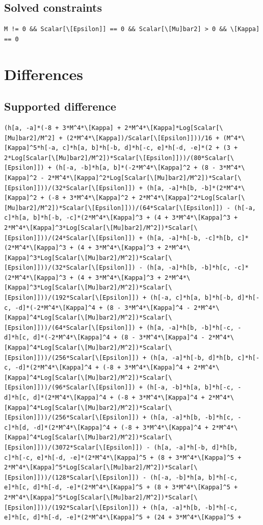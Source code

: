 \documentclass[11pt]{article}
\begin{document}
\subsection{Solved constraints}
\begin{verbatim}
M != 0 && Scalar[\[Epsilon]] == 0 && Scalar[\[Mu]bar2] > 0 && \[Kappa] == 0
\end{verbatim}
\section{Differences}
\subsection{Supported difference}
\begin{verbatim}
(h[a, -a]*(-8 + 3*M^4*\[Kappa] + 2*M^4*\[Kappa]*Log[Scalar[\[Mu]bar2]/M^2] + (2*M^4*\[Kappa])/Scalar[\[Epsilon]]))/16 + (M^4*\[Kappa]^5*h[-a, c]*h[a, b]*h[-b, d]*h[-c, e]*h[-d, -e]*(2 + (3 + 2*Log[Scalar[\[Mu]bar2]/M^2])*Scalar[\[Epsilon]]))/(80*Scalar[\[Epsilon]]) + (h[-a, -b]*h[a, b]*(-2*M^4*\[Kappa]^2 + (8 - 3*M^4*\[Kappa]^2 - 2*M^4*\[Kappa]^2*Log[Scalar[\[Mu]bar2]/M^2])*Scalar[\[Epsilon]]))/(32*Scalar[\[Epsilon]]) + (h[a, -a]*h[b, -b]*(2*M^4*\[Kappa]^2 + (-8 + 3*M^4*\[Kappa]^2 + 2*M^4*\[Kappa]^2*Log[Scalar[\[Mu]bar2]/M^2])*Scalar[\[Epsilon]]))/(64*Scalar[\[Epsilon]]) - (h[-a, c]*h[a, b]*h[-b, -c]*(2*M^4*\[Kappa]^3 + (4 + 3*M^4*\[Kappa]^3 + 2*M^4*\[Kappa]^3*Log[Scalar[\[Mu]bar2]/M^2])*Scalar[\[Epsilon]]))/(24*Scalar[\[Epsilon]]) + (h[a, -a]*h[-b, -c]*h[b, c]*(2*M^4*\[Kappa]^3 + (4 + 3*M^4*\[Kappa]^3 + 2*M^4*\[Kappa]^3*Log[Scalar[\[Mu]bar2]/M^2])*Scalar[\[Epsilon]]))/(32*Scalar[\[Epsilon]]) - (h[a, -a]*h[b, -b]*h[c, -c]*(2*M^4*\[Kappa]^3 + (4 + 3*M^4*\[Kappa]^3 + 2*M^4*\[Kappa]^3*Log[Scalar[\[Mu]bar2]/M^2])*Scalar[\[Epsilon]]))/(192*Scalar[\[Epsilon]]) + (h[-a, c]*h[a, b]*h[-b, d]*h[-c, -d]*(-2*M^4*\[Kappa]^4 + (8 - 3*M^4*\[Kappa]^4 - 2*M^4*\[Kappa]^4*Log[Scalar[\[Mu]bar2]/M^2])*Scalar[\[Epsilon]]))/(64*Scalar[\[Epsilon]]) + (h[a, -a]*h[b, -b]*h[-c, -d]*h[c, d]*(-2*M^4*\[Kappa]^4 + (8 - 3*M^4*\[Kappa]^4 - 2*M^4*\[Kappa]^4*Log[Scalar[\[Mu]bar2]/M^2])*Scalar[\[Epsilon]]))/(256*Scalar[\[Epsilon]]) + (h[a, -a]*h[-b, d]*h[b, c]*h[-c, -d]*(2*M^4*\[Kappa]^4 + (-8 + 3*M^4*\[Kappa]^4 + 2*M^4*\[Kappa]^4*Log[Scalar[\[Mu]bar2]/M^2])*Scalar[\[Epsilon]]))/(96*Scalar[\[Epsilon]]) + (h[-a, -b]*h[a, b]*h[-c, -d]*h[c, d]*(2*M^4*\[Kappa]^4 + (-8 + 3*M^4*\[Kappa]^4 + 2*M^4*\[Kappa]^4*Log[Scalar[\[Mu]bar2]/M^2])*Scalar[\[Epsilon]]))/(256*Scalar[\[Epsilon]]) + (h[a, -a]*h[b, -b]*h[c, -c]*h[d, -d]*(2*M^4*\[Kappa]^4 + (-8 + 3*M^4*\[Kappa]^4 + 2*M^4*\[Kappa]^4*Log[Scalar[\[Mu]bar2]/M^2])*Scalar[\[Epsilon]]))/(3072*Scalar[\[Epsilon]]) - (h[a, -a]*h[-b, d]*h[b, c]*h[-c, e]*h[-d, -e]*(2*M^4*\[Kappa]^5 + (8 + 3*M^4*\[Kappa]^5 + 2*M^4*\[Kappa]^5*Log[Scalar[\[Mu]bar2]/M^2])*Scalar[\[Epsilon]]))/(128*Scalar[\[Epsilon]]) - (h[-a, -b]*h[a, b]*h[-c, e]*h[c, d]*h[-d, -e]*(2*M^4*\[Kappa]^5 + (8 + 3*M^4*\[Kappa]^5 + 2*M^4*\[Kappa]^5*Log[Scalar[\[Mu]bar2]/M^2])*Scalar[\[Epsilon]]))/(192*Scalar[\[Epsilon]]) + (h[a, -a]*h[b, -b]*h[-c, e]*h[c, d]*h[-d, -e]*(2*M^4*\[Kappa]^5 + (24 + 3*M^4*\[Kappa]^5 + 
\end{verbatim}
\end{document}
